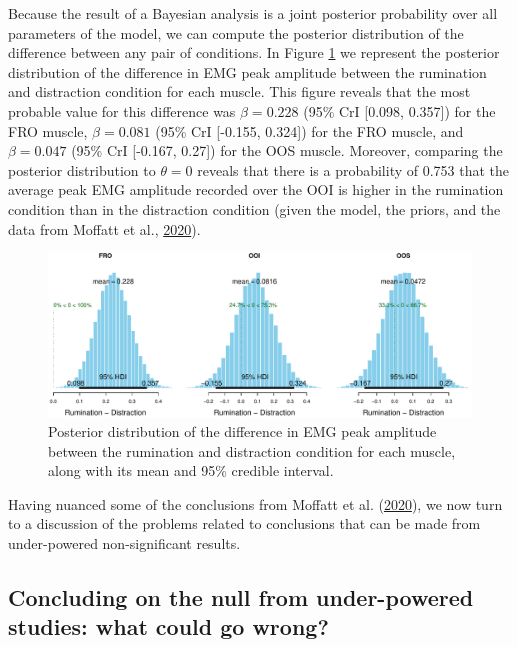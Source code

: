 \documentclass[
  english,
  man, donotrepeattitle,floatsintext]{apa6}
\begin{document}
Because the result of a Bayesian analysis is a joint posterior probability over all parameters of the model, we can compute the posterior distribution of the difference between any pair of conditions. In Figure \ref{fig:posterior} we represent the posterior distribution of the difference in EMG peak amplitude between the rumination and distraction condition for each muscle. This figure reveals that the most probable value for this difference was \(\beta = 0.228\) (95\% CrI {[}0.098, 0.357{]}) for the FRO muscle, \(\beta = 0.081\) (95\% CrI {[}-0.155, 0.324{]}) for the FRO muscle, and \(\beta = 0.047\) (95\% CrI {[}-0.167, 0.27{]}) for the OOS muscle. Moreover, comparing the posterior distribution to \(\theta = 0\) reveals that there is a probability of 0.753 that the average peak EMG amplitude recorded over the OOI is higher in the rumination condition than in the distraction condition (given the model, the priors, and the data from Moffatt et al., \protect\hyperlink{ref-moffatt_inner_2020}{2020}).

\begin{figure}[!htb]

{\centering \includegraphics[width=1\linewidth]{manuscript_files/figure-latex/posterior-1} 

}

\caption{Posterior distribution of the difference in EMG peak amplitude between the rumination and distraction condition for each muscle, along with its mean and 95\% credible interval.}\label{fig:posterior}
\end{figure}

Having nuanced some of the conclusions from Moffatt et al. (\protect\hyperlink{ref-moffatt_inner_2020}{2020}), we now turn to a discussion of the problems related to conclusions that can be made from under-powered non-significant results.

\hypertarget{concluding-on-the-null-from-under-powered-studies-what-could-go-wrong}{%
\subsection{Concluding on the null from under-powered studies: what could go wrong?}\label{concluding-on-the-null-from-under-powered-studies-what-could-go-wrong}}
\end{document}
